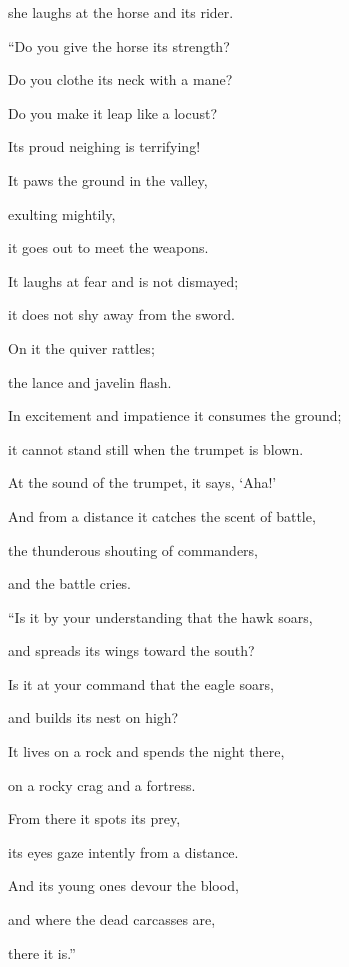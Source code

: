 {\par }{\Q she
laughs
at the horse
and its
rider.
\par }{\Q {}“Do you give
the horse
its strength?
\par }{\Q Do you clothe
its neck
with a mane?
\par }{\Q {}Do you make it leap
like a locust?
\par }{\Q Its proud
neighing
is terrifying!
\par }{\Q {}It paws
the ground in the valley,
\par }{\Q exulting
mightily,
\par }{\Q it goes out
to meet
the weapons.
\par }{\Q {}It laughs
at fear
and is not
dismayed;
\par }{\Q it does not
shy away from the sword.
\par }{\Q {}On
it the quiver
rattles;
\par }{\Q the lance
and javelin
flash.
\par }{\Q {}In excitement
and impatience
it consumes
the ground;
\par }{\Q it cannot
stand still
when
the trumpet
is blown.
\par }{\Q {}At the sound of the trumpet,
it says,
‘Aha!’
\par }{\Q And from a distance
it catches the scent
of battle,
\par }{\Q the thunderous
shouting of commanders,
\par }{\Q and the battle cries.
\par }{\Q {}“Is it by your understanding
that the hawk
soars,
\par }{\Q and spreads
its wings
toward the south?
\par }{\Q {}Is it at your command
that
the eagle
soars,
\par }{\Q and builds
its nest on high?
\par }{\Q {}It lives
on a rock
and spends the night
there,
\par }{\Q on
a rocky
crag
and a fortress.
\par }{\Q {}From there
it spots
its prey,
\par }{\Q its eyes
gaze
intently from a distance.
\par }{\Q {}And its young
ones devour the blood,
\par }{\Q and where
the dead
carcasses
are,
\par }{\Q there
it is.”

}
